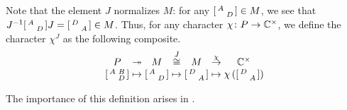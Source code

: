 \begin{definition} \label{def:chi-j}
    Note that the element $J$ normalizes $M$: for any $\begin{bsmallmatrix}
		A \\ & D
	\end{bsmallmatrix}\in M$, we see that $J^{-1}\begin{bsmallmatrix}
		A \\ & D
	\end{bsmallmatrix}J=\begin{bsmallmatrix}
		D \\ & A
	\end{bsmallmatrix}\in M$. Thus, for any character $\chi\colon P\to\mathbb C^\times$, we define the character $\chi^J$ as the following composite.
	\[\arraycolsep=1.4pt\begin{array}{cccccccc}
		P &\onto& M &\stackrel J\cong& M &\stackrel\chi\to& \CC^\times \\
		\begin{bsmallmatrix}
			A & B \\ & D
		\end{bsmallmatrix} &\mapsto& \begin{bsmallmatrix}
			A \\ & D
		\end{bsmallmatrix} &\mapsto& \begin{bsmallmatrix}
			D \\ & A 
		\end{bsmallmatrix} &\mapsto& \chi\left(\begin{bsmallmatrix}
			D \\ & A 
		\end{bsmallmatrix}\right)
	\end{array}\]
\end{definition}
\begin{remark}
	The importance of this definition arises in .
\end{remark}
